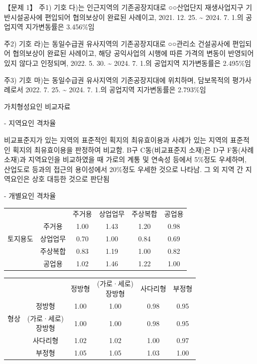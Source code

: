 \begin{longquestion}{【문제 1】}
주1) 기호 다)는 인근지역의 기존공장지대로 ○○산업단지 재생사업지구 기반시설공사에 편입되어 협의보상이 완료된 사례이고, 2021. 12. 25. \textasciitilde{} 2024. 7. 1.의 공업지역 지가변동률은 3.456\%임 \par
주2) 기호 라)는 동일수급권 유사지역의 기존공장지대로 ○○관리소 건설공사에 편입되어 협의보상이 완료된 사례이고, 해당 공익사업의 시행에 따른 가격의 변동이 반영되어 있지 않다고 인정되며, 2022. 5. 30. \textasciitilde{} 2024. 7. 1.의 공업지역 지가변동률은 2.495\%임 \par
주3) 기호 마)는 동일수급권 유사지역의 기존공장지대에 위치하며, 담보목적의 평가사례로서 2022. 7. 25. \textasciitilde{} 2024. 7. 1.의 공업지역 지가변동률은 2.793\%임 \par
\medskip{} 가치형성요인 비교자료 \par
- 지역요인 격차율 \par
비교표준지가 있는 지역의 표준적인 획지의 최유효이용과 사례가 있는 지역의 표준적인 획지의 최유효이용을 판정하여 비교함. B구 C동(비교표준지 소재)은 D구 F동(사례 소재)과 지역요인을 비교하였을 때 가로의 계통 및 연속성 등에서 5\%정도 우세하며, 산업도로 등과의 접근의 용이성에서 20\%정도 우세한 것으로 나타남. 그 외 지역 간 지역요인은 상호 대등한 것으로 판단됨 \par
- 개별요인 격차율 \par
{\small\centering
\begin{tabular}{|c|c|c|c|c|c|}
\hline
\multirow{5}{*}{토지용도} &  & 주거용 & 상업업무 & 주상복합 & 공업용 \\
\cline{2-6}
 & 주거용 & 1.00 & 1.43 & 1.20 & 0.98 \\
\cline{2-6}
 & 상업업무 & 0.70 & 1.00 & 0.84 & 0.69 \\
\cline{2-6}
 & 주상복합 & 0.83 & 1.19 & 1.00 & 0.82 \\
\cline{2-6}
 & 공업용 & 1.02 & 1.46 & 1.22 & 1.00 \\
\hline
\end{tabular}\par}

{\small\centering
\begin{tabular}{|c|c|c|c|c|c|}
\hline
\multirow{5}{*}{형상} &  & 정방형 & \makecell{(가로·세로)\\장방형} & 사다리형 & 부정형 \\
\cline{2-6}
 & 정방형 & 1.00 & 1.00 & 0.98 & 0.95 \\
\cline{2-6}
 & \makecell{(가로·세로)\\장방형} & 1.00 & 1.00 & 0.98 & 0.95 \\
\cline{2-6}
 & 사다리형 & 1.02 & 1.02 & 1.00 & 0.97 \\
\cline{2-6}
 & 부정형 & 1.05 & 1.05 & 1.03 & 1.00 \\
\hline
\end{tabular}\par}


\end{longquestion}
